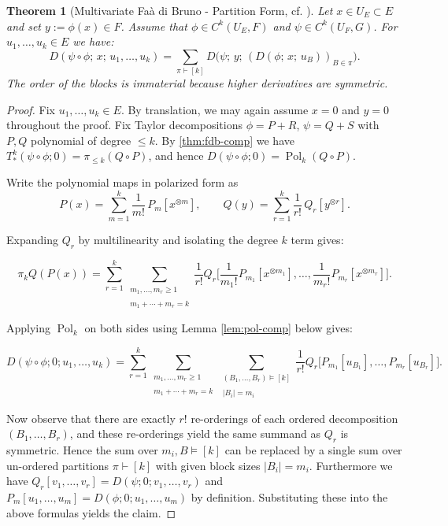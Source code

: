 \documentclass[10pt,a4paper]{article}
\theoremstyle{plain}
\newtheorem{theorem}{Theorem}
\theoremstyle{definition}
\newcommand{\1}{\mathbb{1}} %
\newcommand{\tensor}{\otimes} %
\newcommand{\ssum}[1]{\sum_{\substack{#1}}} %
\renewcommand{\part}{\vdash} %
\newcommand{\opart}{\models} %
\DeclareMathOperator{\Pol}{Pol} %
\begin{document}
\begin{theorem}[Multivariate Faà di Bruno - Partition Form, cf. \citep{Levy2006}]

\label{thm:fdb-part} Let \(x \in U_E \subset E\) and set
\(y := \phi(x) \in F\). Assume that \(\phi \in C^k(U_E, F)\) and
\(\psi \in C^k(U_F, G)\). For \(u_1,\dots,u_k\in E\) we have: \[
  D(\psi\circ\phi;\, x;\, u_1,\dots,u_k)
  =
  \sum_{\pi \part [k]}
  D\bigl(\psi;\, y;\, (D(\phi;\, x;\, u_B))_{B\in\pi}\bigr).
\] The order of the blocks is immaterial because higher derivatives are
symmetric.

\end{theorem}

\begin{proof}

Fix \(u_1,\dots,u_k\in E\). By translation, we may again assume \(x=0\)
and \(y=0\) throughout the proof. Fix Taylor decompositions
\(\phi = P + R\), \(\psi = Q + S\) with \(P,Q\) polynomial of degree
\(\le k\). By \ref{thm:fdb-comp} we have
\(T_{\ast}^k(\psi \circ \phi; 0) = \pi_{\leq k}(Q \circ P)\), and hence
\(D(\psi\circ\phi; 0) = \Pol_k (Q \circ P)\).

Write the polynomial maps in polarized form as \[
  P(x) = \sum_{m=1}^k \frac{1}{m!}\,P_m[x^{\tensor m}], \qquad
  Q(y) = \sum_{r=1}^k \frac{1}{r!}\,Q_r[y^{\tensor r}].
\]

Expanding \(Q_r\) by multilinearity and isolating the degree \(k\) term
gives:

\[
  \pi_k Q(P(x))
  = 
  \sum_{r=1}^k
  \sum_{\substack{m_1,\dots,m_r\ge1 \\\\ m_1+\cdots+m_r = k}}
  \frac{1}{r!} Q_r\bigl[\frac{1}{m_1!} P_{m_1}[x^{\tensor m_1}],\dots,\frac{1}{m_r!} P_{m_r}[x^{\tensor m_r}]\bigr].
\]

Applying \(\Pol_k\) on both sides using Lemma \ref{lem:pol-comp} below
gives:

\[
  D(\psi\circ\phi; 0; u_1,\dots,u_k)
  = 
  \sum_{r=1}^k
  \ssum{m_1,\dots,m_r\ge1 \\\\ m_1+\cdots+m_r = k}
  \ssum{(B_1,\dots,B_r) \opart [k] \\\\ |B_i| = m_i}
  \frac{1}{r!}
  Q_r\bigl[P_{m_1}[u_{B_1}],\dots,P_{m_r}[u_{B_r}]\bigr].
\]

Now observe that there are exactly \(r!\) re-orderings of each ordered
decomposition \((B_1,\dots,B_r)\), and these re-orderings yield the same
summand as \(Q_r\) is symmetric. Hence the sum over
\(m_i, B \opart [k]\) can be replaced by a single sum over un-ordered
partitions \(\pi \part [k]\) with given block sizes \(|B_i| = m_i\).
Furthermore we have \(Q_r[v_1,\dots,v_r] = D(\psi; 0; v_1,\dots,v_r)\)
and \(P_m[u_1,\dots,u_m] = D(\phi; 0; u_1,\dots,u_m)\) by definition.
Substituting these into the above formulas yields the claim.


\end{proof}
\end{document}
